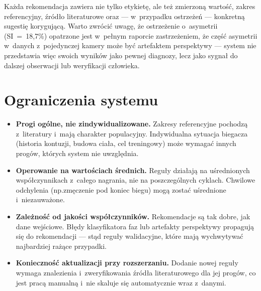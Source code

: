 Każda rekomendacja zawiera nie tylko etykietę, ale też zmierzoną wartość, zakres referencyjny, źródło literaturowe oraz --- w~przypadku ostrzeżeń --- konkretną sugestię korygującą. Warto zwrócić uwagę, że ostrzeżenie o~asymetrii (SI~=~18{,}7\%) opatrzone jest w~pełnym raporcie zastrzeżeniem, że część asymetrii w~danych z~pojedynczej kamery może być artefaktem perspektywy --- system nie przedstawia więc swoich wyników jako pewnej diagnozy, lecz jako sygnał do dalszej obserwacji lub weryfikacji człowieka.

\newpage
\section{Ograniczenia systemu}
\label{sec:ograniczenia-rekomendacji}

\begin{itemize}
    \item \textbf{Progi ogólne, nie zindywidualizowane.} Zakresy referencyjne pochodzą z~literatury i~mają charakter populacyjny. Indywidualna sytuacja biegacza (historia kontuzji, budowa ciała, cel treningowy) może wymagać innych progów, których system nie uwzględnia.
    \item \textbf{Operowanie na wartościach średnich.} Reguły działają na uśrednionych współczynnikach z~całego nagrania, nie na poszczególnych cyklach. Chwilowe odchylenia (np.zmęczenie pod koniec biegu) mogą zostać uśrednione i~niezauważone.
    \item \textbf{Zależność od jakości współczynników.} Rekomendacje są tak dobre, jak dane wejściowe. Błędy klasyfikatora faz lub artefakty perspektywy propagują się do rekomendacji --- stąd reguły walidacyjne, które mają wychwytywać najbardziej rażące przypadki.
    \item \textbf{Konieczność aktualizacji przy rozszerzaniu.} Dodanie nowej reguły wymaga znalezienia i~zweryfikowania źródła literaturowego dla jej progów, co jest pracą manualną i~nie skaluje się automatycznie wraz z~danymi.
\end{itemize}
